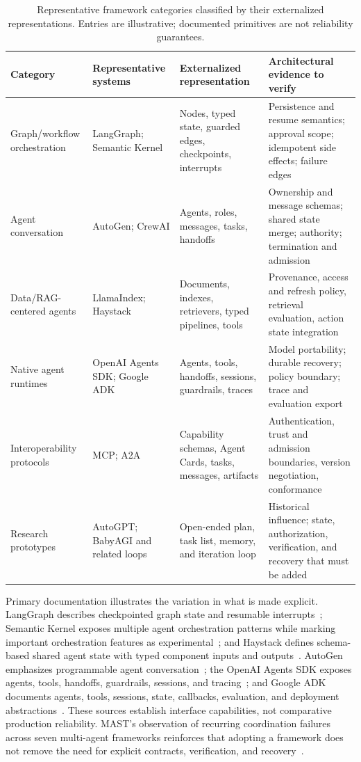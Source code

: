 \begin{table}[H]
\centering
\caption{Representative framework categories classified by their externalized representations. Entries are illustrative; documented primitives are not reliability guarantees.}
\label{tab:framework-landscape}
\small
\surveytableformat
\begin{tabularx}{\textwidth}{L{2.7cm}L{2.7cm}Y Y}
\toprule
{}\textbf{Category} & \textbf{Representative systems} & \textbf{Externalized representation} & \textbf{Architectural evidence to verify} \\
\midrule
Graph/workflow orchestration & LangGraph; Semantic Kernel & Nodes, typed state, guarded edges, checkpoints, interrupts & Persistence and resume semantics; approval scope; idempotent side effects; failure edges \\
Agent conversation & AutoGen; CrewAI & Agents, roles, messages, tasks, handoffs & Ownership and message schemas; shared state merge; authority; termination and admission \\
Data/RAG-centered agents & LlamaIndex; Haystack & Documents, indexes, retrievers, typed pipelines, tools & Provenance, access and refresh policy, retrieval evaluation, action state integration \\
Native agent runtimes & OpenAI Agents SDK; Google ADK & Agents, tools, handoffs, sessions, guardrails, traces & Model portability; durable recovery; policy boundary; trace and evaluation export \\
Interoperability protocols & MCP; A2A & Capability schemas, Agent Cards, tasks, messages, artifacts & Authentication, trust and admission boundaries, version negotiation, conformance \\
Research prototypes & AutoGPT; BabyAGI and related loops & Open-ended plan, task list, memory, and iteration loop & Historical influence; state, authorization, verification, and recovery that must be added \\
\bottomrule
\end{tabularx}
\end{table}

Primary documentation illustrates the variation in what is made explicit. LangGraph describes checkpointed graph state and resumable interrupts~\cite{langgraph2026persistence}; Semantic Kernel exposes multiple agent orchestration patterns while marking important orchestration features as experimental~\cite{microsoft2025semanticagents}; and Haystack defines schema-based shared agent state with typed component inputs and outputs~\cite{deepset2026haystackstate}. AutoGen emphasizes programmable agent conversation~\cite{wu2023autogen}; the OpenAI Agents SDK exposes agents, tools, handoffs, guardrails, sessions, and tracing~\cite{openai2025agentssdk}; and Google ADK documents agents, tools, sessions, state, callbacks, evaluation, and deployment abstractions~\cite{google2026adkdocs}. These sources establish interface capabilities, not comparative production reliability. MAST's observation of recurring coordination failures across seven multi-agent frameworks reinforces that adopting a framework does not remove the need for explicit contracts, verification, and recovery~\cite{cemri2025mast}.

